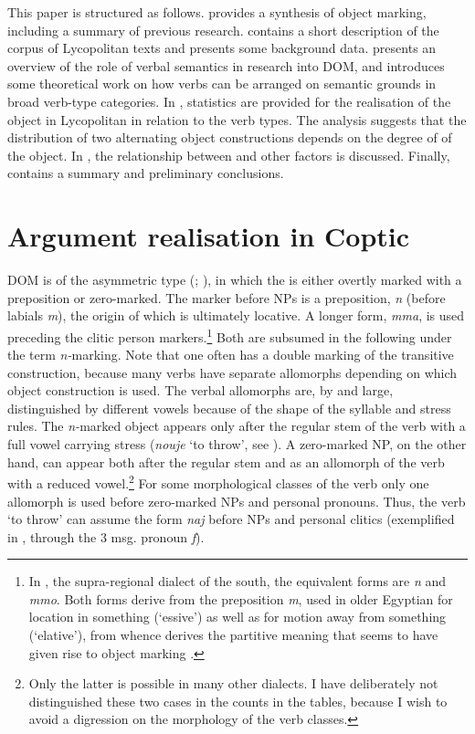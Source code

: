 \documentclass[output=paper]{LSP/langsci}
\begin{document}
This paper is structured as follows.  provides a synthesis of  object marking, including a summary of previous research.  contains a short description of the corpus of Lycopolitan texts and presents some background data.  presents an overview of the role of verbal semantics in research into DOM, and introduces some theoretical work on how verbs can be arranged on semantic grounds in broad verb-type categories. In , statistics are provided for the realisation of the object in Lycopolitan  in relation to the verb types. The analysis suggests that the distribution of two alternating object constructions depends on the degree of  of the object. In , the relationship between  and other factors is discussed. Finally,  contains a summary and preliminary conclusions. 

\section{Argument realisation in Coptic}\label{06-en-sec:2}

 DOM is of the asymmetric type (\citealt{Hoopetal2008Case-marking}; \citealt{Iemmolo2013Symmetric}), in which the  is either overtly marked with a preposition or zero-marked. The marker before NPs is a preposition, \textit{n} (before labials \textit{m}), the origin of which is ultimately locative. A longer form, \textit{mma}, is used preceding the clitic person markers.\footnote{In , the supra-regional dialect of the south, the equivalent forms are \textit{n} and \textit{mmo}. Both forms derive from the preposition  \textit{m}, used in older Egyptian for location in something (‘essive’) as well as for motion away from something (‘elative’), from whence derives the partitive meaning that seems to have given rise to object marking \citep{Winand2015Expression}.} Both are subsumed in the following under the term \textit{n-}marking. Note that one often has a double marking of the transitive construction, because many verbs have separate allomorphs depending on which object construction is used. The verbal allomorphs are, by and large, distinguished by different vowels because of the shape of the syllable and stress rules. The \textit{n-}marked object appears only after the regular stem of the verb with a full vowel carrying stress (\eg \textit{nouje} ‘to throw’, see ). A zero-marked NP, on the other hand, can appear both after the regular stem and as an allomorph of the verb with a reduced vowel.\footnote{Only the latter is possible in many other dialects. I have deliberately not distinguished these two cases in the counts in the tables, because I wish to avoid a digression on the morphology of the verb classes.} For some morphological classes of the verb only one allomorph is used before zero-marked NPs and personal pronouns. Thus, the verb ‘to throw’ can assume the form \textit{naj} before NPs and personal clitics (exemplified in , through the 3 msg. pronoun \textit{f}). 
\end{document}
